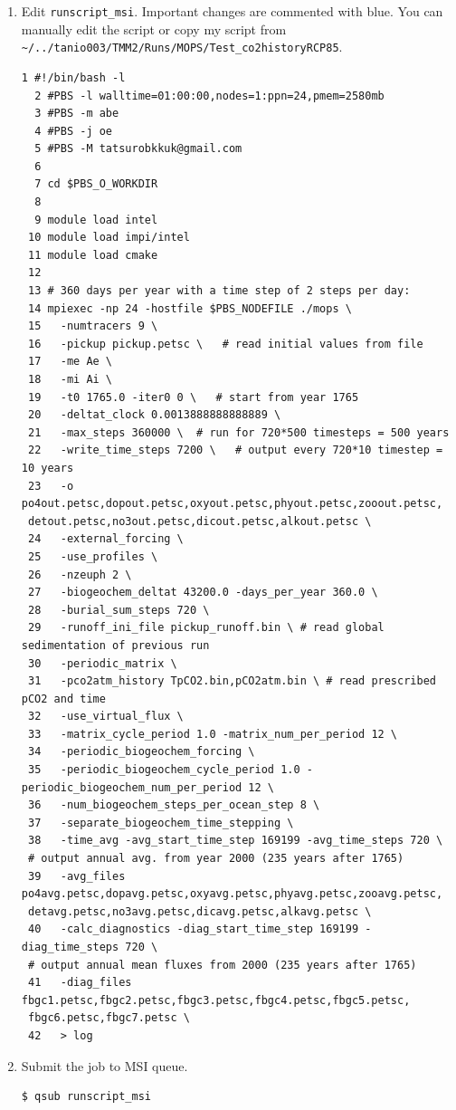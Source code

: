 \documentclass[a4paper]{article}
\begin{document}
\begin{enumerate}
\item Edit \verb|runscript_msi|. Important changes are commented with blue. You can manually edit the script or copy my script from \verb|~/../tanio003/TMM2/Runs/MOPS/Test_co2historyRCP85|.
\lstset{language=sh} 
\begin{lstlisting}[frame=single,basicstyle=\scriptsize,commentstyle=\color{blue}]
  1 #!/bin/bash -l
  2 #PBS -l walltime=01:00:00,nodes=1:ppn=24,pmem=2580mb
  3 #PBS -m abe
  4 #PBS -j oe
  5 #PBS -M tatsurobkkuk@gmail.com
  6
  7 cd $PBS_O_WORKDIR
  8
  9 module load intel
 10 module load impi/intel
 11 module load cmake
 12
 13 # 360 days per year with a time step of 2 steps per day:
 14 mpiexec -np 24 -hostfile $PBS_NODEFILE ./mops \
 15   -numtracers 9 \
 16   -pickup pickup.petsc \   # read initial values from file
 17   -me Ae \
 18   -mi Ai \
 19   -t0 1765.0 -iter0 0 \   # start from year 1765
 20   -deltat_clock 0.0013888888888889 \   
 21   -max_steps 360000 \  # run for 720*500 timesteps = 500 years
 22   -write_time_steps 7200 \   # output every 720*10 timestep = 10 years
 23   -o po4out.petsc,dopout.petsc,oxyout.petsc,phyout.petsc,zooout.petsc,
 detout.petsc,no3out.petsc,dicout.petsc,alkout.petsc \
 24   -external_forcing \
 25   -use_profiles \
 26   -nzeuph 2 \
 27   -biogeochem_deltat 43200.0 -days_per_year 360.0 \
 28   -burial_sum_steps 720 \
 29   -runoff_ini_file pickup_runoff.bin \ # read global sedimentation of previous run
 30   -periodic_matrix \
 31   -pco2atm_history TpCO2.bin,pCO2atm.bin \ # read prescribed pCO2 and time
 32   -use_virtual_flux \
 33   -matrix_cycle_period 1.0 -matrix_num_per_period 12 \
 34   -periodic_biogeochem_forcing \
 35   -periodic_biogeochem_cycle_period 1.0 -periodic_biogeochem_num_per_period 12 \
 36   -num_biogeochem_steps_per_ocean_step 8 \
 37   -separate_biogeochem_time_stepping \
 38   -time_avg -avg_start_time_step 169199 -avg_time_steps 720 \ 
 # output annual avg. from year 2000 (235 years after 1765)
 39   -avg_files po4avg.petsc,dopavg.petsc,oxyavg.petsc,phyavg.petsc,zooavg.petsc,
 detavg.petsc,no3avg.petsc,dicavg.petsc,alkavg.petsc \
 40   -calc_diagnostics -diag_start_time_step 169199 -diag_time_steps 720 \ 
 # output annual mean fluxes from 2000 (235 years after 1765)
 41   -diag_files fbgc1.petsc,fbgc2.petsc,fbgc3.petsc,fbgc4.petsc,fbgc5.petsc,
 fbgc6.petsc,fbgc7.petsc \
 42   > log
\end{lstlisting}

\item Submit the job to MSI queue.
\begin{lstlisting}[style=DOS]
 $ qsub runscript_msi
\end{lstlisting}


\end{enumerate}
\end{document}
